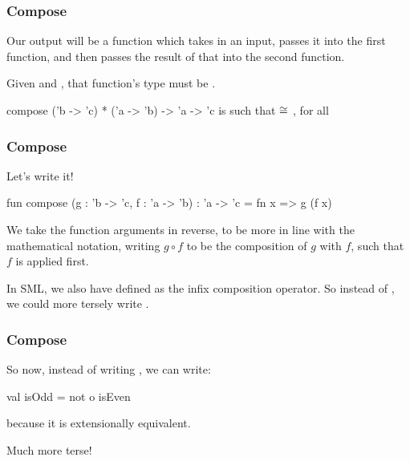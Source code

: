 \documentclass[aspectratio=169, handout]{beamer}
\begin{document}
\begin{frame}[fragile]
  \frametitle{Compose}

  Our output will be a function which takes in an input, passes it into the
  first function, and then passes the result of that into the second function.

  \pause
  \vspace{\fill}

  Given  and , that function's type must be
  . 

  \spec
    {compose}
    {('b -> 'c) * ('a -> 'b) -> 'a -> 'c}
    {}
    { is such that  $\cong$ , for all }
\end{frame}

\begin{frame}[fragile]
  \frametitle{Compose}

  Let's write it!

  \pause
  \vspace{\fill}

  \begin{codeblock}
    fun compose (g : 'b -> 'c, f : 'a -> 'b) : 'a -> 'c =
      fn x => g (f x)
  \end{codeblock}

  \pause
  \vspace{\fill}

  We take the function arguments in reverse, to be more in line with the
  mathematical notation, writing $g \circ f$ to be the composition of $g$
  with $f$, such that $f$ is applied first.

  \pause
  \vspace{\fill}

  In SML, we also have  defined as the infix composition operator. So
  instead of , we could more tersely write . 
\end{frame}

\begin{frame}[fragile]
  \frametitle{Compose}

  So now, instead of writing , we can write:

  \pause
  \vspace{\fill}

  \begin{codeblock}
    val isOdd = not o isEven
  \end{codeblock}
  because it is extensionally equivalent.

  \pause
  \vspace{\fill}

  Much more terse!
\end{frame}
\end{document}

